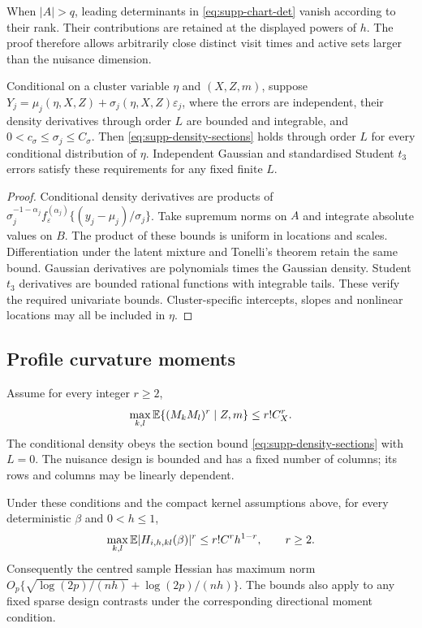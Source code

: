 When $|A|>q$, leading determinants in
\eqref{eq:supp-chart-det} vanish according to their rank. Their
contributions are retained at the displayed powers of $h$. The proof
therefore allows arbitrarily close distinct visit times and active
sets larger than the nuisance dimension.

\begin{proposition}\label{prop:supp-density-example}
Conditional on a cluster variable $\eta$ and $(X,Z,m)$, suppose
$Y_j=\mu_j(\eta,X,Z)+\sigma_j(\eta,X,Z)\varepsilon_j$, where the
errors are independent, their density derivatives through order $L$
are bounded and integrable, and $0<c_\sigma\leq\sigma_j\leq C_\sigma$.
Then \eqref{eq:supp-density-sections} holds through order $L$ for
every conditional distribution of $\eta$. Independent Gaussian and
standardised Student $t_3$ errors satisfy these requirements for any
fixed finite $L$.
\end{proposition}

\begin{proof}
Conditional density derivatives are products of
$\sigma_j^{-1-\alpha_j}f_\varepsilon^{(\alpha_j)}
\{(y_j-\mu_j)/\sigma_j\}$.
Take supremum norms on $A$ and integrate absolute values on $B$.
The product of these bounds is uniform in locations and scales.
Differentiation under the latent mixture and Tonelli's theorem retain
the same bound. Gaussian derivatives are polynomials times the
Gaussian density. Student $t_3$ derivatives are bounded rational
functions with integrable tails. These verify the required univariate
bounds. Cluster-specific intercepts, slopes and nonlinear locations
may all be included in $\eta$.
\end{proof}

\subsection{Profile curvature moments}

Assume for every integer $r\geq2$,
\begin{equation}\label{eq:supp-design-moments}
 \max_{k,l}\mathbb{E}\{(M_kM_l)^r\mid Z,m\}\leq r!C_X^r.
\end{equation}
The conditional density obeys the section bound
\eqref{eq:supp-density-sections} with $L=0$. The nuisance design is
bounded and has a fixed number of columns; its rows and columns may
be linearly dependent.

\begin{theorem}\label{thm:supp-oracle}
Under these conditions and the compact kernel assumptions above, for
every deterministic $\beta$ and $0<h\leq1$,
\begin{equation}\label{eq:supp-H-moments}
 \max_{k,l}\mathbb{E}|H_{i,h,kl}(\beta)|^r\leq r!C^rh^{1-r},\qquad r\geq2.
\end{equation}
Consequently the centred sample Hessian has maximum norm
$O_p\{\sqrt{\log(2p)/(nh)}+\log(2p)/(nh)\}$.
The bounds also apply to any fixed sparse design contrasts under the
corresponding directional moment condition.
\end{theorem}


